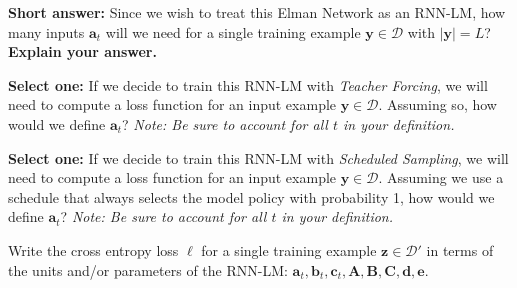 \documentclass[11pt,addpoints,answers]{exam}
\numberwithin{equation}{section} %
\numberwithin{figure}{section} %
\numberwithin{table}{section} %
\newcommand{\Dc}{\mathcal{D}}
\newcommand{\av}{\mathbf{a}}
\newcommand{\bv}{\mathbf{b}}
\newcommand{\cv}{\mathbf{c}}
\newcommand{\dv}{\mathbf{d}}
\newcommand{\ev}{\mathbf{e}}
\newcommand{\yv}{\mathbf{y}}
\newcommand{\zv}{\mathbf{z}}
\newcommand{\Av}{\mathbf{A}}
\newcommand{\Bv}{\mathbf{B}}
\newcommand{\Cv}{\mathbf{C}}
\begin{document}
\begin{questions}


\question[1] \textbf{Short answer:}  Since we wish to treat this Elman Network as an RNN-LM, how many inputs $\av_t$ will we need for a single training example $\yv \in \Dc$ with $|\yv| = L$? \textbf{Explain your answer.}
    \begin{tcolorbox}[fit,height=2cm, width=15cm, blank, borderline={1pt}{-2pt}]
    \end{tcolorbox}

\question[1] \textbf{Select one:} If we decide to train this RNN-LM with \emph{Teacher Forcing}, we will need to compute a loss function for an input example $\yv \in \Dc$. Assuming so, how would we define $\av_t$? \textit{Note: Be sure to account for all $t$ in your definition.}
    \begin{tcolorbox}[fit,height=2cm, width=15cm, blank, borderline={1pt}{-2pt}]
    \end{tcolorbox}
    
\question[1] \textbf{Select one:} If we decide to train this RNN-LM with \emph{Scheduled Sampling}, we will need to compute a loss function for an input example $\yv \in \Dc$. Assuming we use a schedule that always selects the model policy with probability 1, how would we define $\av_t$? \textit{Note: Be sure to account for all $t$ in your definition.} 
    \begin{tcolorbox}[fit,height=2cm, width=15cm, blank, borderline={1pt}{-2pt}]
    \end{tcolorbox}
    
    
\question[1] Write the cross entropy loss $\ell$ for a single training example $\zv \in \Dc'$ in terms of the units and/or parameters of the RNN-LM: $\av_t, \bv_t, \cv_t, \Av, \Bv, \Cv, \dv, \ev$.
    \begin{tcolorbox}[fit,height=2cm, width=15cm, blank, borderline={1pt}{-2pt}]
    \end{tcolorbox}
    

\end{questions}
\end{document}

